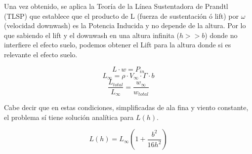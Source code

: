 \documentclass[two column]{article}
\begin{document}
\vspace{0.5cm}

Una vez obtenido, se aplica la Teoría de la Línea Sustentadora de Prandtl (TLSP) que establece que el producto de L (fuerza de sustentación ó lift) por $\omega$ (velocidad downwash) es la Potencia Inducida y no depende de la altura. Por lo que sabiendo el lift y el downwash en una altura infinita ($h>>b$) donde no interfiere el efecto suelo, podemos obtener el Lift para la altura donde si es relevante el efecto suelo.
\vspace{5cm}

\begingroup
\renewcommand{\thefootnote}{(\arabic{equation})}

\begin{equation}
    L \cdot w = P_{in}
\end{equation}
\begin{equation}
   L_{\infty} = \rho \cdot V_{\infty} \cdot \Gamma \cdot b 
\end{equation}
\begin{equation}
    \frac{L_{total}}{L_{\infty}} = \frac{w_{\infty}}{w_{total}}
\end{equation}


\endgroup

Cabe decir que en estas condiciones, simplificadas de ala fina y viento constante, el problema sí tiene solución analítica para $L(h)$.



\vspace{0.5cm}

\begingroup
\renewcommand{\thefootnote}{(\arabic{equation})}

\begin{equation}
    L(h) = L_{\infty} \left( 1 + \frac{b^2}{16h^2} \right)
\end{equation}

\endgroup

\vspace{0.5cm}
\end{document}
